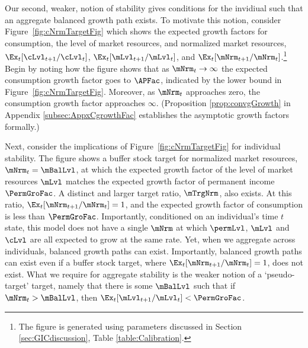 \documentclass[\econtexRoot/BufferStockTheory]{subfiles}
\begin{document}

Our second, weaker, notion of stability gives conditions for the invidiual such that an aggregate balanced growth path exists. To motivate this notion, consider Figure~\ref{fig:cNrmTargetFig} which shows the expected growth factors for consumption, the level of market resources, and normalized market resources, $\Ex_{t}[\cLvl_{t+1}/\cLvl_{t}]$, $\Ex_{t}[\mLvl_{t+1}/\mLvl_{t}]$, and $\Ex_{t}[\mNrm_{t+1}/\mNrm_{t}]$.\footnote{The figure is generated using parameters discussed in Section \ref{sec:GICdiscussion}, Table \ref{table:Calibration}.}
Begin by noting how the figure shows that as $\mNrm_{t} \rightarrow \infty$ the expected consumption growth factor goes to ${\APFac}$, indicated by the lower bound in Figure~\ref{fig:cNrmTargetFig}.
Moreover, as $\mNrm_{t}$ approaches zero, the consumption growth factor approaches $\infty$.
(Proposition  \ref{prop:convgGrowth}  in Appendix \ref{subsec:AppxCgrowthFac} establishes the asymptotic growth factors formally.)

Next, consider the implications of Figure~\ref{fig:cNrmTargetFig} for individual stability.
The figure shows a buffer stock target for normalized market resources, $\mNrm_{t} = \mBalLvl$, at which the expected growth factor of the level of market resources $\mLvl$ matches the expected growth factor of permanent income $\PermGroFac$.
A distinct and larger target ratio, $\mTrgNrm$, also exists.
At this ratio, $\Ex_{t}[\mNrm_{t+1}/\mNrm_{t}]=1$, and the expected growth factor of consumption is less than $\PermGroFac$.
Importantly, conditioned on an individual's time $t$ state, this model does not have a single $\mNrm$ at which $\permLvl$, $\mLvl$ and $\cLvl$ are all expected to grow at the same rate.
Yet, when we aggregate across individuals, balanced growth paths can exist. 
Importantly, balanced growth paths can exist even if a buffer stock target, where $\Ex_{t}[\mNrm_{t+1}/\mNrm_{t}]=1$, does not exist. 
What we require for aggregate stability is the weaker notion of a `pseudo-target' target, namely that there is some ${\mBalLvl}$ such that if $\mNrm_{t}>{\mBalLvl}$, then $\Ex_{t}[\mLvl_{t+1}/\mLvl_{t}] < \PermGroFac$.
\end{document}
